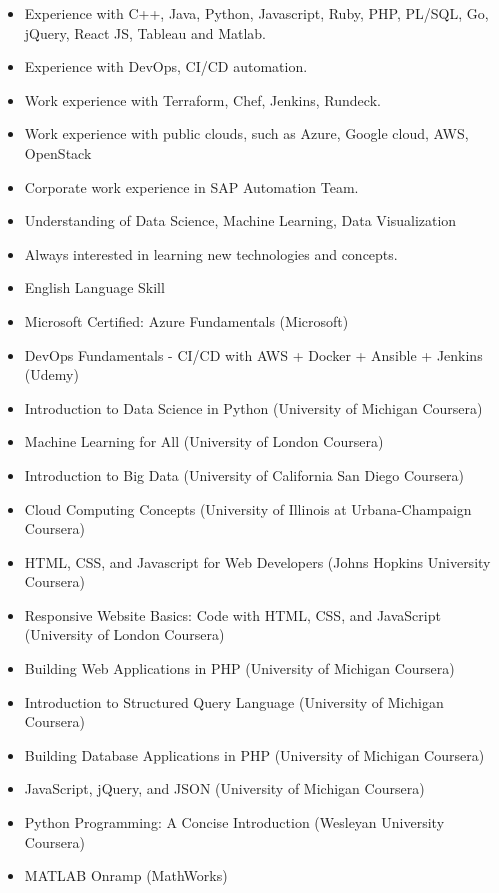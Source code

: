 \documentclass[10pt,a4paper,ragged2e,withhyper]{altacv}
\begin{document}
\begin{paracol}{2}
\begin{itemize}
\item Experience with C++, Java, Python, Javascript, Ruby, PHP, PL/SQL, Go, jQuery, React JS, Tableau and Matlab.
\item Experience with DevOps, CI/CD automation.
\item Work experience with Terraform, Chef, Jenkins, Rundeck.
\item Work experience with public clouds, such as Azure, Google cloud, AWS, OpenStack
\item Corporate work experience in SAP Automation Team.
\item Understanding of Data Science, Machine Learning, Data Visualization
\item Always interested in learning new technologies and concepts. 
\item English Language Skill
\end{itemize}

\divider



\begin{itemize}
\item Microsoft Certified: Azure Fundamentals (Microsoft)
\item DevOps Fundamentals - CI/CD with AWS + Docker + Ansible + Jenkins (Udemy)
\item Introduction to Data Science in Python (University of Michigan Coursera)
\item Machine Learning for All (University of London Coursera)
\item Introduction to Big Data (University of California San Diego Coursera)
\item Cloud Computing Concepts (University of Illinois at Urbana-Champaign Coursera)
\item HTML, CSS, and Javascript for Web Developers (Johns Hopkins University Coursera)
\item Responsive Website Basics: Code with HTML, CSS, and JavaScript (University of London Coursera)
\item Building Web Applications in PHP (University of Michigan Coursera)
\item Introduction to Structured Query Language (University of Michigan Coursera)
\item Building Database Applications in PHP (University of Michigan Coursera)
\item JavaScript, jQuery, and JSON (University of Michigan Coursera)
\item Python Programming: A Concise Introduction (Wesleyan University Coursera)
\item MATLAB Onramp (MathWorks)
\end{itemize}



\end{paracol}
\end{document}
